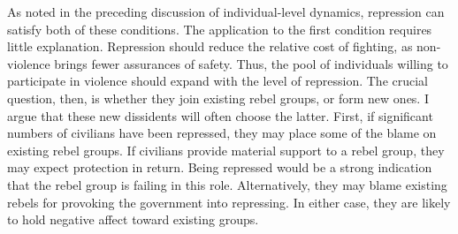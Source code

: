 \documentclass[12pt,]{book}
\theoremstyle{definition}
\theoremstyle{definition}
\theoremstyle{definition}
\theoremstyle{remark}
\begin{document}
As noted in the preceding discussion of individual-level dynamics,
repression can satisfy both of these conditions. The application to the
first condition requires little explanation. Repression should reduce
the relative cost of fighting, as non-violence brings fewer assurances
of safety. Thus, the pool of individuals willing to participate in
violence should expand with the level of repression. The crucial
question, then, is whether they join existing rebel groups, or form new
ones. I argue that these new dissidents will often choose the latter.
First, if significant numbers of civilians have been repressed, they may
place some of the blame on existing rebel groups. If civilians provide
material support to a rebel group, they may expect protection in return.
Being repressed would be a strong indication that the rebel group is
failing in this role. Alternatively, they may blame existing rebels for
provoking the government into repressing. In either case, they are
likely to hold negative affect toward existing groups.
\end{document}
